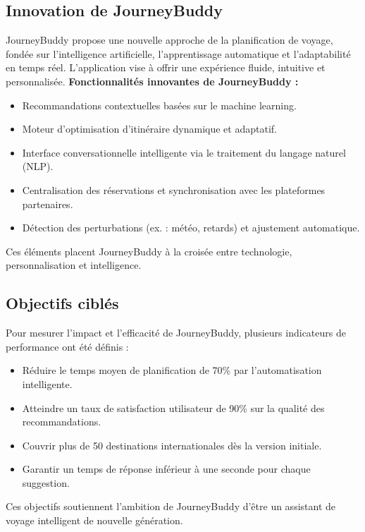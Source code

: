 \subsection{Innovation de JourneyBuddy}

JourneyBuddy propose une nouvelle approche de la planification de voyage, fondée sur l’intelligence artificielle, l’apprentissage automatique et l’adaptabilité en temps réel. L’application vise à offrir une expérience fluide, intuitive et personnalisée.
\textbf{Fonctionnalités innovantes de JourneyBuddy :}
\begin{itemize}
    \item Recommandations contextuelles basées sur le machine learning.
    \item Moteur d’optimisation d’itinéraire dynamique et adaptatif.
    \item Interface conversationnelle intelligente via le traitement du langage naturel (NLP).
    \item Centralisation des réservations et synchronisation avec les plateformes partenaires.
    \item Détection des perturbations (ex. : météo, retards) et ajustement automatique.
\end{itemize}

Ces éléments placent JourneyBuddy à la croisée entre technologie, personnalisation et intelligence.

\subsection{Objectifs ciblés}

Pour mesurer l’impact et l’efficacité de JourneyBuddy, plusieurs indicateurs de performance ont été définis :

\begin{itemize}
    \item Réduire le temps moyen de planification de 70\% par l’automatisation intelligente.
    \item Atteindre un taux de satisfaction utilisateur de 90\% sur la qualité des recommandations.
    \item Couvrir plus de 50 destinations internationales dès la version initiale.
    \item Garantir un temps de réponse inférieur à une seconde pour chaque suggestion.
\end{itemize}

Ces objectifs soutiennent l’ambition de JourneyBuddy d’être un assistant de voyage intelligent de nouvelle génération.


